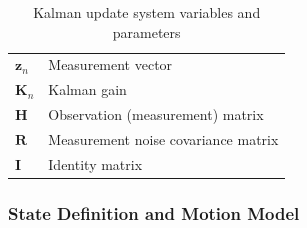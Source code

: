 \documentclass{article}
\begin{document}
\begin{table}[H]
    \centering
    \renewcommand{\arraystretch}{1.2}
    \begin{tabular}{lp{8cm}}
        \toprule
        \midrule
        $\mathbf{z}_n$ & Measurement vector \\
        $\mathbf{K}_n$ & Kalman gain \\
        $\mathbf{H}$ & Observation (measurement) matrix \\
        $\mathbf{R}$ & Measurement noise covariance matrix \\
        $\mathbf{I}$ & Identity matrix \\
        \bottomrule
    \end{tabular}
    \caption{Kalman update system variables and parameters}
\end{table}

\subsubsection{State Definition and Motion Model}
\end{document}
